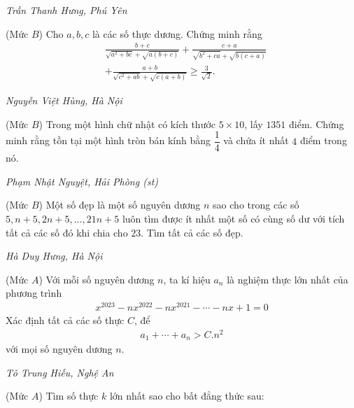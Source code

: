 \begin{multicols}{2}
\begin{figure}[H]
\begin{tikzpicture}[thachthuctoanhoc]
		\end{tikzpicture}
		\vspace*{-10pt}
	\end{figure}
	\begin{flushright}
		\textit{Trần Thanh Hưng, Phú Yên}
	\end{flushright}
	{}
	(Mức $B$) Cho $a, b, c$ là các số thực dương. Chứng minh rằng
	\begin{align*}
		&\frac{b+c}{\sqrt{\!a^2\!+\!b c}\!+\!\!\sqrt{\!a(b+c)}}\!+\!\frac{c\!+\!a}{\sqrt{\!b^2\!+\!c a}\!+\!\!\sqrt{\!b(c\!+\!a)}}\\
		&+\frac{a+b}{\sqrt{c^2+a b}+\sqrt{c(a+b)}} \geq \frac{3}{\sqrt{2}} .
	\end{align*}
	\begin{flushright}
		\textit{Nguyễn Việt Hùng, Hà Nội}
	\end{flushright}
	{}
	(Mức $B$) Trong một hình chữ nhật có kích thước $5\times 10$, lấy $1351$ điểm. Chứng minh rằng tồn tại một hình tròn bán kính bằng $\dfrac14$ và chứa ít nhất $4$ điểm trong nó. 
	\begin{flushright}
		\textit{Phạm Nhật Nguyệt, Hải Phòng (st)}
	\end{flushright}
	{}
	(Mức $B$) Một số đẹp là một số nguyên dương $n$ sao cho  trong các số $5,n+5,2n+5,\ldots,21n+5$ luôn tìm được ít nhất một số có cùng số dư với tích tất cả các số đó khi chia cho $23$. Tìm tất cả các số đẹp.
	\begin{flushright}
		\textit{Hà Duy Hưng, Hà Nội}
	\end{flushright}
	{}
	(Mức $A$) Với mỗi số nguyên dương $n$, ta kí hiệu $a_n$ là nghiệm thực lớn nhất của phương trình
	\begin{align*}
		x^{2023}-nx^{2022}-nx^{2021}-\cdots-nx+1=0
	\end{align*}
	Xác định tất cả các số thực $C$, để 
	\begin{align*}
		a_1+\cdots+a_n>C. n^2
	\end{align*}
	với mọi số nguyên dương $n$.
	\begin{flushright}
		\textit{Tô Trung Hiếu, Nghệ An}
	\end{flushright}
	{}
	(Mức $A$) Tìm số thực $k$ lớn nhất sao cho bất đẳng thức sau: 
	\begin{align*}

\end{align*}
\end{multicols}
